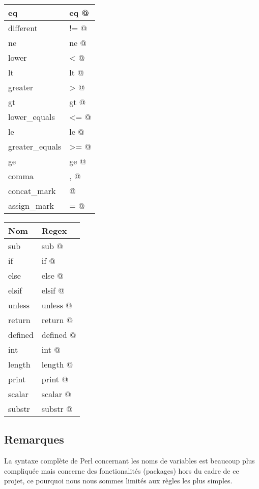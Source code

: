 \documentclass[a4paper,10pt]{article}
\begin{document}
\begin{center}
\begin{tabular}{ | l | l |}
		    	\hline eq & \verb@ eq @ \\
		    	\hline different & \verb@ != @ \\
		    	\hline ne & \verb@ ne @ \\
		    	\hline lower & \verb@ < @ \\
		    	\hline lt & \verb@ lt @ \\
		    	\hline greater & \verb@ > @ \\
		    	\hline gt & \verb@ gt @ \\
		    	\hline lower\_equals & \verb@ <= @ \\
		    	\hline le & \verb@ le @ \\
		    	\hline greater\_equals & \verb@ >= @ \\
		    	\hline ge & \verb@ ge @ \\
		    	\hline comma & \verb@ , @ \\
		    	\hline concat\_mark & \verb@ \. @ \\
		    	\hline assign\_mark & \verb@ = @ \\
		    	\hline
			\end{tabular}	

			\begin{tabular}{ | l | l |}
				\hline Nom & Regex \\
		    	\hline sub & \verb@ sub @ \\
		    	\hline if & \verb@ if @ \\
		    	\hline else & \verb@ else @ \\
		    	\hline elsif & \verb@ elsif @ \\
		    	\hline unless & \verb@ unless @ \\
		    	\hline return & \verb@ return @ \\
		    	\hline defined & \verb@ defined @ \\
		    	\hline int & \verb@ int @ \\
		    	\hline length & \verb@ length @ \\
		    	\hline print & \verb@ print @ \\
		    	\hline scalar & \verb@ scalar @ \\
		    	\hline substr & \verb@ substr @ \\
		    	\hline
		    \end{tabular}
		\end{center}
	
	\subsection{Remarques}
		La syntaxe complète de Perl concernant les noms de variables est beaucoup plus
		compliquée mais concerne des fonctionalités (packages) hors du cadre de ce
		projet, ce pourquoi nous nous sommes limités aux règles les plus simples.
	
\end{document}
